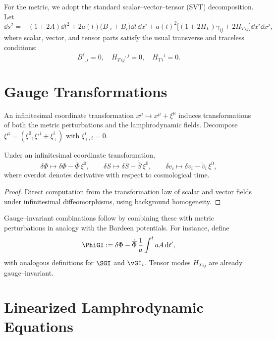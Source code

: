 For the metric, we adopt the standard scalar--vector--tensor (SVT)
decomposition.  Let
\begin{equation}
\label{eq:metric-perturb}
\dd s^2 = -(1+2A)\dd t^2 + 2a(t)\bigl(B_{,i}+B_i\bigr)\dd t\,\dd x^i
+ a(t)^2\bigl[(1+2H_L)\gamma_{ij}+2H_{T\,ij}\bigr]\dd x^i\dd x^j,
\end{equation}
where scalar, vector, and tensor parts satisfy the usual transverse and
traceless conditions:
\[
B^i{}_{,i}=0,\quad H_{T\,ij}{}^{,j}=0,\quad H_{T\,i}{}^i = 0.
\]

\section{Gauge Transformations}

An infinitesimal coordinate transformation
$x^\mu\mapsto x^\mu+\xi^\mu$ induces transformations of both the metric
perturbations and the lamphrodynamic fields.  Decompose
$\xi^\mu=(\xi^0,\xi^{,i}+\xi^i_\perp)$ with $\xi^i_\perp{}_{,i}=0$.

\begin{lemma}
\label{lem:gauge-lamphro}
Under an infinitesimal coordinate transformation,
\[
\delta\Phi \mapsto \delta\Phi - \dot{\overline\Phi}\,\xi^0,\qquad
\delta S \mapsto \delta S - \dot{\overline S}\,\xi^0,\qquad
\delta v_i \mapsto \delta v_i - \dot{\overline v}_i\,\xi^0,
\]
where overdot denotes derivative with respect to cosmological time.
\end{lemma}

\begin{proof}
Direct computation from the transformation law of scalar and vector
fields under infinitesimal diffeomorphisms, using background
homogeneity.
\end{proof}

Gauge--invariant combinations follow by combining these with metric
perturbations in analogy with the Bardeen potentials.  For instance,
define
\[
\PhiGI := \delta\Phi - \dot{\overline\Phi}\,\frac{1}{a}
\int^t a A\,\dd t',
\]
with analogous definitions for $\SGI$ and $\vGI_i$.  Tensor modes
$H_{T\,ij}$ are already gauge--invariant.

\section{Linearized Lamphrodynamic Equations}

